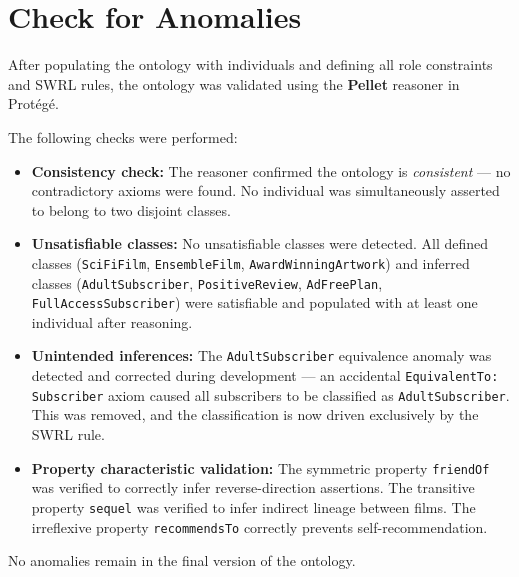 \chapter{Check for Anomalies}

After populating the ontology with individuals and defining all role constraints and SWRL rules, the ontology was validated using the \textbf{Pellet} reasoner in Protégé.

\vspace{0.3cm}
\noindent The following checks were performed:

\begin{itemize}
    \item \textbf{Consistency check:} The reasoner confirmed the ontology is \textit{consistent} — no contradictory axioms were found. No individual was simultaneously asserted to belong to two disjoint classes.

    \item \textbf{Unsatisfiable classes:} No unsatisfiable classes were detected. All defined classes (\texttt{SciFiFilm}, \texttt{EnsembleFilm}, \texttt{AwardWinningArtwork}) and inferred classes (\texttt{AdultSubscriber}, \texttt{PositiveReview}, \texttt{AdFreePlan}, \texttt{FullAccessSubscriber}) were satisfiable and populated with at least one individual after reasoning.

    \item \textbf{Unintended inferences:} The \texttt{AdultSubscriber} equivalence anomaly was detected and corrected during development — an accidental \texttt{EquivalentTo: Subscriber} axiom caused all subscribers to be classified as \texttt{AdultSubscriber}. This was removed, and the classification is now driven exclusively by the SWRL rule.

    \item \textbf{Property characteristic validation:} The symmetric property \texttt{friendOf} was verified to correctly infer reverse-direction assertions. The transitive property \texttt{sequel} was verified to infer indirect lineage between films. The irreflexive property \texttt{recommendsTo} correctly prevents self-recommendation.
\end{itemize}

\vspace{0.3cm}
\noindent No anomalies remain in the final version of the ontology.